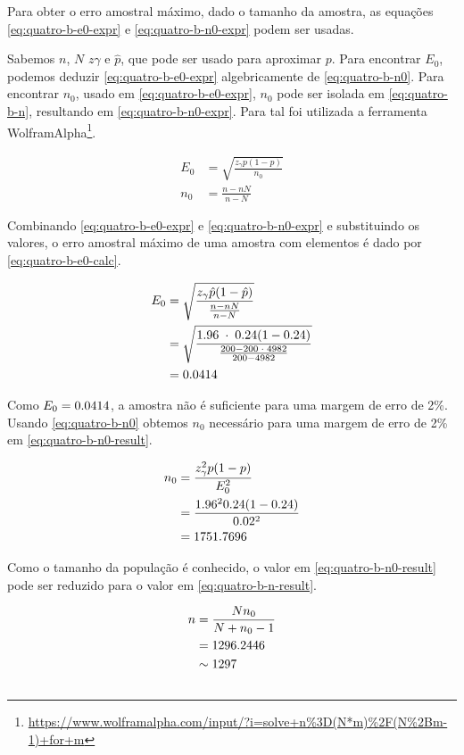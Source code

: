 Para obter o erro amostral máximo, dado o tamanho da amostra, as equações \eqref{eq:quatro-b-e0-expr} e \eqref{eq:quatro-b-n0-expr} podem ser usadas. 

Sabemos $n$, $N$ $z\gamma$ e $\hat{p}$, que pode ser usado para aproximar $p$. Para encontrar $E_0$, podemos deduzir \eqref{eq:quatro-b-e0-expr} algebricamente de \eqref{eq:quatro-b-n0}. Para encontrar $n_0$, usado em \eqref{eq:quatro-b-e0-expr}, $n_0$ pode ser isolada em \eqref{eq:quatro-b-n}, resultando em \eqref{eq:quatro-b-n0-expr}. Para tal foi utilizada a ferramenta WolframAlpha\footnote{\url{https://www.wolframalpha.com/input/?i=solve+n\%3D(N*m)\%2F(N\%2Bm-1)+for+m}}.

\begin{align}
	E_0 &= \label{eq:quatro-b-e0-expr}
	       \sqrt{\frac{z_\gamma p(1 - p) }{n_0}} \\
	n_0 &= \label{eq:quatro-b-n0-expr}
	       \frac{n-n N}{n-N}
\end{align}

Combinando \eqref{eq:quatro-b-e0-expr} e \eqref{eq:quatro-b-n0-expr} e substituindo os valores, o erro amostral máximo de uma amostra com \QUATROn elementos é dado por \eqref{eq:quatro-b-e0-calc}.

\begin{align}
	\label{eq:quatro-b-e0-calc}
	E_0 &= \sqrt{\frac{z_\gamma \hat{p}(1 - \hat{p}) }{\frac{n-n N}{n - N}}} \\
	    &= \sqrt{\frac{1.96 \;\cdot\; 0.24 (1 - 0.24) }{\frac{200 - 200 \;\cdot\; 4982}{200 - 4982}}} \nonumber \\
	    &= 0.0414 \nonumber
\end{align}

Como $E_0 = 0.0414$, a amostra não é suficiente para uma margem de erro de 2\%. Usando \eqref{eq:quatro-b-n0} obtemos $n_0$ necessário para uma margem de erro de 2\% em \eqref{eq:quatro-b-n0-result}.

\begin{align}
	n_0 &= \frac{z_\gamma^2 p(1-p)}{E_0^2} \nonumber \\
	    &= \frac{1.96^2 0.24(1-0.24)}{0.02^2} \nonumber \\
	    &= \label{eq:quatro-b-n0-result}
	       1751.7696	
\end{align}

Como o tamanho da população é conhecido, o valor em \eqref{eq:quatro-b-n0-result} pode ser reduzido para o valor em \eqref{eq:quatro-b-n-result}.

\begin{align}
	n &= \frac{N n_0}{N + n_0 - 1} \nonumber \\
    &= 1296.2446 \nonumber \\
	  &\sim \label{eq:quatro-b-n-result} 
	     1297
\end{align}

\subsection{}
